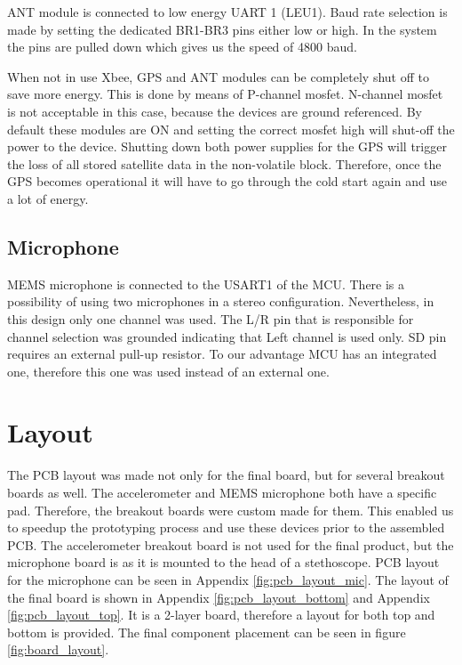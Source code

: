 ANT module is connected to low energy UART 1 (LEU1). Baud rate selection is made by setting the dedicated BR1-BR3 pins either low or high. In the system the pins are pulled down which gives us the speed of 4800 baud. 

When not in use Xbee, GPS and ANT modules can be completely shut off to save more energy. This is done by means of P-channel mosfet. N-channel mosfet is not acceptable in this case, because the devices are ground referenced. By default these modules are ON and setting the correct mosfet high will shut-off the power to the device. Shutting down both power supplies for the GPS will trigger the loss of all stored satellite data in the non-volatile block. Therefore, once the GPS becomes operational it will have to go through the cold start again and use a lot of energy.

\subsection{Microphone}
MEMS microphone is connected to the USART1 of the MCU. There is a possibility of using two microphones in a stereo configuration. Nevertheless, in this design only one channel was used. The L/R pin that is responsible for channel selection was grounded indicating that Left channel is used only. SD pin requires an external pull-up resistor. To our advantage MCU has an integrated one, therefore this one was used instead of an external one.


\section{Layout}
The PCB layout was made not only for the final board, but for several breakout boards as well. The accelerometer and MEMS microphone both have a specific pad. Therefore, the breakout boards were custom made for them. This enabled us to speedup the prototyping process and use these devices prior to the assembled PCB. The accelerometer breakout board is not used for the final product, but the microphone board is as it is mounted to the head of a stethoscope. PCB layout for the microphone can be seen in Appendix \ref{fig:pcb_layout_mic}. The layout of the final board is shown in  Appendix \ref{fig:pcb_layout_bottom} and Appendix \ref{fig:pcb_layout_top}. It is a 2-layer board, therefore a layout for both top and bottom is provided.
The final component placement can be seen in figure \ref{fig:board_layout}. 

